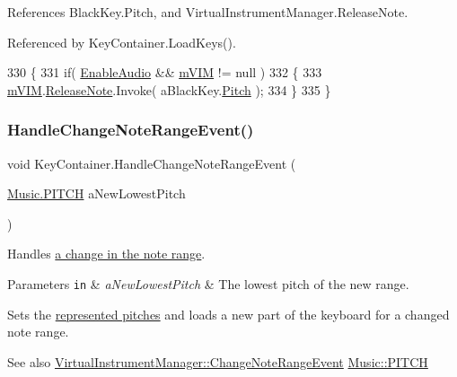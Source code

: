 References Black\+Key.\+Pitch, and Virtual\+Instrument\+Manager.\+Release\+Note.



Referenced by Key\+Container.\+Load\+Keys().


\begin{DoxyCode}
330     \{
331         \textcolor{keywordflow}{if}( \hyperlink{group___key_contain_pub_var_ga5dc9b1349f8fafc894c7f739f6780a8c}{EnableAudio} && \hyperlink{group___key_contain_priv_var_ga57ee3824e2f284403bb70ad9c4dfd307}{mVIM} != null )
332         \{
333             \hyperlink{group___key_contain_priv_var_ga57ee3824e2f284403bb70ad9c4dfd307}{mVIM}.\hyperlink{group___v_i_m_events_ga3a1726a6366126421434c2c7be5e5678}{ReleaseNote}.Invoke( aBlackKey.\hyperlink{group___black_key_pub_var_gad233c456182c9cef7c01486484940439}{Pitch} );
334         \}
335     \}
\end{DoxyCode}
\mbox{\label{group___key_contain_handlers_ga0d82098e4f886f77a33f9d5ed13fe195}} 
\subsubsection{\texorpdfstring{Handle\+Change\+Note\+Range\+Event()}{HandleChangeNoteRangeEvent()}}
{\footnotesize\ttfamily void Key\+Container.\+Handle\+Change\+Note\+Range\+Event (\begin{DoxyParamCaption}\item[{\hyperlink{group___music_enums_ga508f69b199ea518f935486c990edac1d}{Music.\+P\+I\+T\+CH}}]{a\+New\+Lowest\+Pitch }\end{DoxyParamCaption})\hspace{0.3cm}{\ttfamily [private]}}



Handles \hyperlink{group___v_i_m_event_types_class_virtual_instrument_manager_1_1_change_note_range_event}{a change in the note range}. 


\begin{DoxyParams}[1]{Parameters}
\mbox{\tt in}  & {\em a\+New\+Lowest\+Pitch} & The lowest pitch of the new range.\\
\hline
\end{DoxyParams}
Sets the \hyperlink{group___key_contain_priv_var_ga103945a6efe3469191e5253d13fec5be}{represented pitches} and loads a new part of the keyboard for a changed note range. \begin{DoxySeeAlso}{See also}
\hyperlink{group___v_i_m_event_types_class_virtual_instrument_manager_1_1_change_note_range_event}{Virtual\+Instrument\+Manager\+::\+Change\+Note\+Range\+Event} \hyperlink{group___music_enums_ga508f69b199ea518f935486c990edac1d}{Music\+::\+P\+I\+T\+CH} 
\end{DoxySeeAlso}


